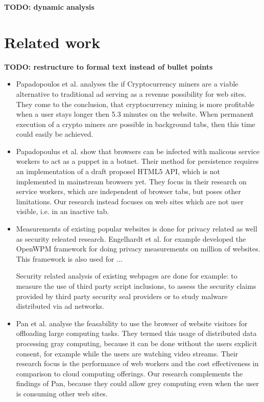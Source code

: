 \documentclass[
	ruledheaders=section,%
	class=report,%
	thesis={type=bachelor},%
	accentcolor=9c,%
	custommargins=true,%
	marginpar=false,%
	parskip=half-,%
	fontsize=11pt,%
]{tudapub}
\begin{document}
    \textbf{TODO: dynamic analysis}

  
  \newpage
  \chapter{Related work}

  \textbf{TODO: restructure to formal text instead of bullet points}

  \begin{itemize}

  \item Papadopoulos et al.\autocite{papadopoulos2018truth} analyses the if Cryptocurrency miners are a viable alternative to traditional ad serving as a revenue possibility for web sites. They come to the conclusion, that cryptocurrency mining is more profitable when a user stays longer then 5.3 minutes on the website. When permanent execution of a crypto miners are possible in background tabs, then this time could easily be achieved.

  \item Papadopoulus et al.\cite{papadopoulos2018master} show that browsers can be infected with malicous service workers to act as a puppet in a botnet. Their method for persistence requires an implementation of a draft proposel HTML5 API, which is not implemented in mainstream browsers yet. They focus in their research on service workers, which are independent of browser tabs, but poses other limitations. Our research instead focuses on web sites which are not user visible, i.e. in an inactive tab.   

    
  \item Measurements of existing popular websites is done for privacy related as well as security releated research. Engelhardt et al.\cite{englehardt2016online} for example developed the OpenWPM framework for doing privacy measurements on million of websites. This framework is also used for ...

    Security related analysis of existing webpages are done for example: to measure the use of third party script inclusions\cite{nikiforakis2012you}, to assess the security claims provided by third party security seal providers\cite{van2014clubbing} or to study malware distributed via ad networks\cite{zarras2014dark}.


  \item Pan et al. analyse the feasability to use the browser of website visitors for offloading large computing tasks\cite{pan2015gray}. They termed this usage of distributed data processing gray computing, because it can be done without the users explicit consent, for example while the users are watching video streams. Their research focus is the performance of web workers and the cost effectiveness in comparison to cloud computing offerings. Our research complements the findings of Pan, because they could allow grey computing even when the user is consuming other web sites.

    
  \end{itemize}
\end{document}
